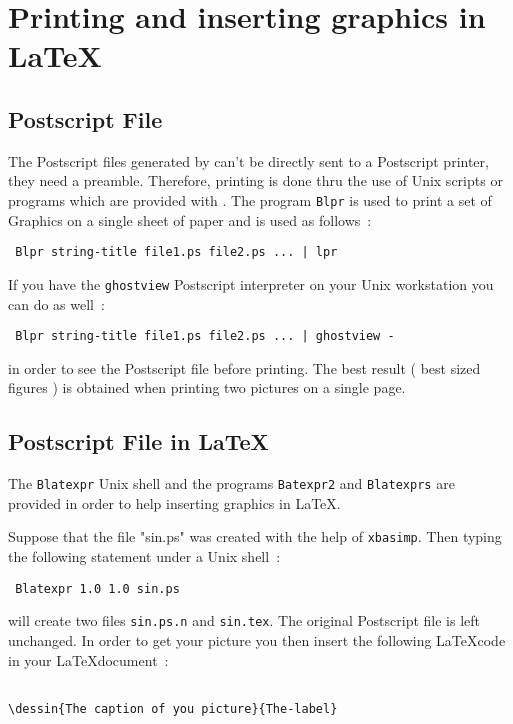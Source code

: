 \section{Printing and inserting \Scilab graphics in \LaTeX}
\subsection{Postscript File}
The Postscript files generated by \Scilab  can't be directly sent to a
Postscript printer, they need a preamble. Therefore, printing is done
thru the use of Unix scripts or programs which are provided with
\Scilab. The program \verb+Blpr+ is used to print a set of \Scilab Graphics 
on a single sheet of paper and is used as follows~:

\begin{verbatim}
 Blpr string-title file1.ps file2.ps ... | lpr 
\end{verbatim}

If you have the \verb+ghostview+ Postscript interpreter on your Unix
workstation you can do as well~:

\begin{verbatim}
 Blpr string-title file1.ps file2.ps ... | ghostview -
\end{verbatim}

in order to see the Postscript file before printing. The best result 
( best sized figures ) is obtained when printing two pictures on a
single page. 

\subsection{Postscript File in \LaTeX}

The \verb|Blatexpr| Unix shell and the programs \verb+Batexpr2+ and 
\verb+Blatexprs+ are provided in order to help inserting 
\Scilab graphics in \LaTeX.

Suppose that the file "sin.ps" was created with the help of
\verb+xbasimp+. Then typing the following statement under a Unix shell~:
\begin{verbatim}
 Blatexpr 1.0 1.0 sin.ps
\end{verbatim}
will create two files \verb+sin.ps.n+ and \verb+sin.tex+. The original
Postscript file is left unchanged. 
In order to get your picture you then insert the following \LaTeX code
in your \LaTeX document~:
\begin{verbatim}

\dessin{The caption of you picture}{The-label}
\end{verbatim}

